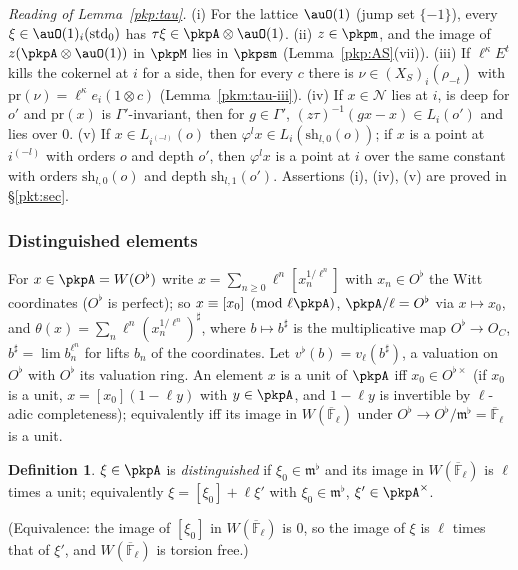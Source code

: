 \documentclass[10pt]{amsart}
\theoremstyle{definition}
\newtheorem{definition}[theorem]{Definition}
\theoremstyle{remark}
\begin{document}
\emph{Reading of Lemma~\ref{pkp:tau}.} (i) For the lattice $\auO(1)$ (jump set $\{-1\}$), every $\xi\in
\auO(1)_i(\mathrm{std}_0)$ has $\tau\xi\in\pkpA\otimes\auO(1)$. (ii) $z\in\pkpm$, and the image of
$z(\pkpA\otimes\auO(1))$ in $\pkpM$ lies in $\pkpsm$ (Lemma~\ref{pkp:AS}(vii)). (iii) If
$\ell^\kappa E^t$ kills the cokernel at $i$ for a side, then for every $c$ there is $\nu\in
(X_S)_i(\rho_{-t})$ with $\mathrm{pr}(\nu)=\ell^\kappa e_i(1\otimes c)$ (Lemma~\ref{pkm:tau-iii}).
(iv) If $x\in\mathcal N$ lies at $i$, is deep for $o'$ and $\mathrm{pr}(x)$ is $\Gamma'$-invariant, then
for $g\in\Gamma'$, $(z\tau)^{-1}(gx-x)\in L_i(o')$ and lies over $0$. (v) If $x\in L_{i^{(-l)}}(o)$
then $\varphi^lx\in L_i(\mathrm{sh}_{l,0}(o))$; if $x$ is a point at $i^{(-l)}$ with orders $o$ and
depth $o'$, then $\varphi^lx$ is a point at $i$ over the same constant with orders $\mathrm{sh}_{l,0}(o)$
and depth $\mathrm{sh}_{l,1}(o')$. Assertions (i), (iv), (v) are proved in \S\ref{pkt:sec}.

\subsubsection{Distinguished elements}\label{pkn:ss-dist}

For $x\in\pkpA=W(O^\flat)$ write $x=\sum_{n\ge0}\ell^n[x_n^{1/\ell^n}]$ with $x_n\in O^\flat$ the Witt
coordinates ($O^\flat$ is perfect); so $x\equiv[x_0]\pmod{\ell\pkpA}$, $\pkpA/\ell=O^\flat$ via $x\mapsto
x_0$, and $\theta(x)=\sum_n\ell^n(x_n^{1/\ell^n})^\sharp$, where $b\mapsto b^\sharp$ is the
multiplicative map $O^\flat\to O_C$, $b^\sharp=\lim b_n^{\ell^n}$ for lifts $b_n$ of the coordinates.
Let $v^\flat(b)=v_\ell(b^\sharp)$, a valuation on $O^\flat$ with $O^\flat$ its valuation ring. An element
$x$ is a unit of $\pkpA$ iff $x_0\in O^{\flat\times}$ (if $x_0$ is a unit, $x=[x_0](1-\ell y)$ with
$y\in\pkpA$, and $1-\ell y$ is invertible by $\ell$-adic completeness); equivalently iff its image in
$W(\overline{\mathbb F}_\ell)$ under $O^\flat\to O^\flat/\mathfrak m^\flat=\overline{\mathbb F}_\ell$ is a unit.

\begin{definition}\label{pkn:def-dist}
$\xi\in\pkpA$ is \emph{distinguished} if $\xi_0\in\mathfrak m^\flat$ and its image in
$W(\overline{\mathbb F}_\ell)$ is $\ell$ times a unit; equivalently $\xi=[\xi_0]+\ell\xi'$ with
$\xi_0\in\mathfrak m^\flat$, $\xi'\in\pkpA^\times$.
\end{definition}

(Equivalence: the image of $[\xi_0]$ in $W(\overline{\mathbb F}_\ell)$ is $0$, so the image of $\xi$
is $\ell$ times that of $\xi'$, and $W(\overline{\mathbb F}_\ell)$ is torsion free.)
\end{document}

